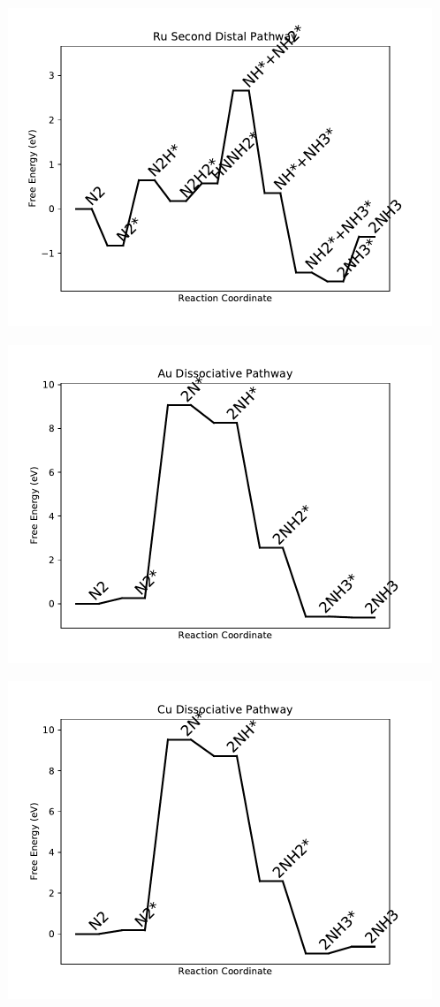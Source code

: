 \begin{figure}
\includegraphics[width=0.8\linewidth]{data/plots/Ru_distal_2.pdf}
\label{fig:Ru_distal_2}
\end{figure}

\begin{figure}
\includegraphics[width=0.8\linewidth]{data/plots/Au_dissociative.pdf}
\label{fig:Au_dissociative}
\end{figure}

\begin{figure}
\includegraphics[width=0.8\linewidth]{data/plots/Cu_dissociative.pdf}
\label{fig:Cu_dissociative}
\end{figure}

